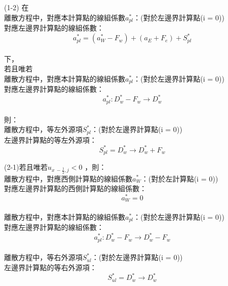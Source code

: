 \documentclass[12pt]{article}
\begin{document}
\noindent (1-2)
        在\\
        離散方程中，對應本計算點的線組係數$a_{pl}^{*}$：(對於左邊界計算點(i = 0))\\    
        對應左邊界計算點的線組係數：\\
        $$a_{pl}^{*} = (a_{W}^{*}-F_{w}) + (a_{E} + F_{e}) + S_{pl}^{*}$$\\
        下，\\
        若且唯若\\
        離散方程中，對應本計算點的線組係數$a_{pl}^{*}$：(對於左邊界計算點(i = 0))\\
        對應左邊界計算點的線組係數：\\
        $$a_{pl}^{*} : D_{w}^{*} - F_{w} \rightarrow D_{w}^{*}$$\\
        則：\\
        離散方程中，等左外源項$S_{pl}^{*}$：(對於左邊界計算點(i = 0))\\
        左邊界計算點的等左外源項：\\
        \begin{equation}
        S_{pl}^{*} = D_{w}^{*} \rightarrow D_{w}^{*}+F_{w}
        \end{equation}


\noindent (2-1)若且唯若$u_{x\ -\frac{1}{2} ,j} < 0$ ，則：\\
離散方程中，對應西側計算點的線組係數$a_{W}^{*}$：(對於左計算點(i = 0))\\
對應左邊界計算點的西側計算點的線組係數：\\
$$a_{W}^{*} = 0$$\\
離散方程中，對應本計算點的線組係數$a_{pl}^{*}$：(對於左邊界計算點(i = 0))\\
對應左邊界計算點的線組係數：\\
$$a_{pl}^{*} : D_{w}^{*} - F_{w} \rightarrow D_{w}^{*} - F_{w}$$\\
離散方程中，等右外源項$S_{ul}^{*}$：(對於左邊界計算點(i = 0))\\
左邊界計算點的等右外源項：\\
$$S_{ul}^{*} = D_{w}^{*} \rightarrow D_{w}^{*}$$\\
\end{document}
